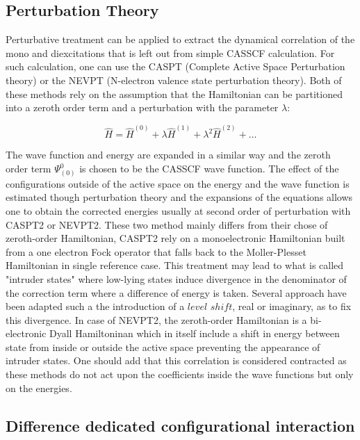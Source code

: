 \documentclass[10pt]{report}
\numberwithin{equation}{section}
\begin{document}
\subsection{Perturbation Theory}

Perturbative treatment can be applied to extract the dynamical correlation of the mono and diexcitations that is left out from simple CASSCF calculation. For such calculation, one can use the CASPT (Complete Active Space Perturbation theory)
or the NEVPT (N-electron valence state perturbation theory). Both of these methods rely on the assumption that the Hamiltonian can be partitioned into a zeroth order term and a perturbation with the parameter $\lambda$:

\begin{equation}
    \hat{H}=\hat{H}^{(0)}+\lambda\hat{H}^{(1)}+\lambda^2 \hat{H}^{(2)}+\ldots
\end{equation}


The wave function and energy are expanded in a similar way and the zeroth order term $\Psi_{(0)}^{0}$ is chosen to be the CASSCF wave function. 
The effect of the configurations outside of the active space on the energy and the wave function is estimated though perturbation theory and the expansions of the equations allows one to obtain the corrected energies
usually at second order of perturbation with CASPT2 or NEVPT2. These two method mainly differs from their chose of zeroth-order Hamiltonian, CASPT2 rely on a monoelectronic Hamiltonian built from a one electron Fock operator that falls back to the Moller-Plesset Hamiltonian in single reference case. 
This treatment may lead to what is called "intruder states" where low-lying states induce divergence in the denominator of the correction term where a difference of energy is taken. Several approach have been adapted such a the introduction of a $level$ $shift$, real or imaginary, as to fix this divergence.
In case of NEVPT2, the zeroth-order Hamiltonian is a bi-electronic Dyall Hamiltoninan which in itself include a shift in energy between state from inside or outside the active space preventing the appearance of intruder states.
One should add that this correlation is considered contracted as these methods do not act upon the coefficients inside the wave functions but only on the energies.

\subsection{Difference dedicated configurational interaction}
\end{document}
